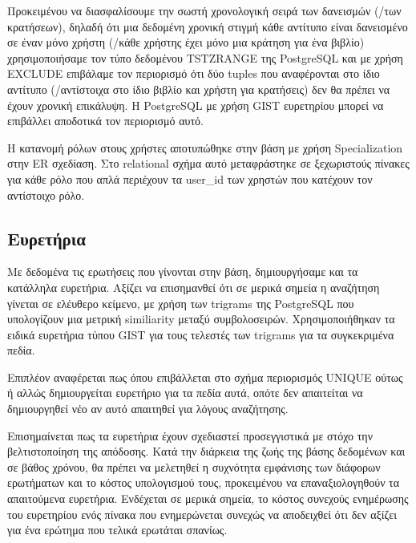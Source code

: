 \documentclass[a4paper]{article}
\begin{document}
\par Προκειμένου να διασφαλίσουμε την σωστή χρονολογική σειρά των δανεισμών (/των κρατήσεων), δηλαδή ότι μια δεδομένη χρονική στιγμή κάθε αντίτυπο είναι δανεισμένο σε έναν μόνο χρήστη (/κάθε χρήστης έχει μόνο μια κράτηση για ένα βιβλίο) χρησιμοποιήσαμε τον τύπο δεδομένου TSTZRANGE της PostgreSQL και με χρήση EXCLUDE επιβάλαμε τον περιορισμό ότι δύο tuples που αναφέρονται στο ίδιο αντίτυπο (/αντίστοιχα στο ίδιο βιβλίο και χρήστη για κρατήσεις) δεν θα πρέπει να έχουν χρονική επικάλυψη. Η PostgreSQL με χρήση GIST ευρετηρίου μπορεί να επιβάλλει αποδοτικά τον περιορισμό αυτό.

\par Η κατανομή ρόλων στους χρήστες αποτυπώθηκε στην βάση με χρήση Specialization στην ER σχεδίαση. Στο relational σχήμα αυτό μεταφράστηκε σε ξεχωριστούς πίνακες για κάθε ρόλο που απλά περιέχουν τα user\_id των χρηστών που κατέχουν τον αντίστοιχο ρόλο.

\subsection{Ευρετήρια}

\par Με δεδομένα τις ερωτήσεις που γίνονται στην βάση, δημιουργήσαμε και τα κατάλληλα ευρετήρια. Αξίζει να επισημανθεί ότι σε μερικά σημεία η αναζήτηση γίνεται σε ελέυθερο κείμενο, με χρήση των trigrams της PostgreSQL που υπολογίζουν μια μετρική similiarity μεταξύ συμβολοσειρών. Χρησιμοποιήθηκαν τα ειδικά ευρετήρια τύπου GIST για τους τελεστές των trigrams για τα συγκεκριμένα πεδία.

\par Επιπλέον αναφέρεται πως όπου επιβάλλεται στο σχήμα περιορισμός UNIQUE ούτως ή αλλώς δημιουργείται ευρετήριο για τα πεδία αυτά, οπότε δεν απαιτείται να δημιουργηθεί νέο αν αυτό απαιτηθεί για λόγους αναζήτησης.

\par Επισημαίνεται πως τα ευρετήρια έχουν σχεδιαστεί προσεγγιστικά με στόχο την βελτιστοποίηση της απόδοσης. Κατά την διάρκεια της ζωής της βάσης δεδομένων και σε βάθος χρόνου, θα πρέπει να μελετηθεί η συχνότητα εμφάνισης των διάφορων ερωτήματων και το κόστος υπολογισμού τους, προκειμένου να επαναξιολογηθούν τα απαιτούμενα ευρετήρια. Ενδέχεται σε μερικά σημεία, το κόστος συνεχούς ενημέρωσης του ευρετηρίου ενός πίνακα που ενημερώνεται συνεχώς να αποδειχθεί ότι δεν αξίζει για ένα ερώτημα που τελικά ερωτάται σπανίως.
\end{document}
